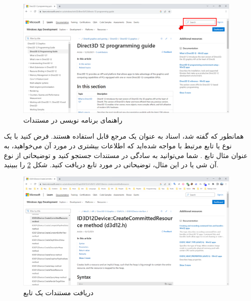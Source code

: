 {\begin{spacing}{1.5}
        \begin{figure}[H]
            \centering
            \setlength{\belowcaptionskip}{-10pt}
            \includegraphics[width=\textwidth]{Images/3/3.Intro.1.1}
            \caption{راهنمای برنامه نویسی  در مستندات }
            \label{fig:3.Intro.1.1}
        \end{figure}

        همانطور که گفته شد، اسناد به عنوان یک مرجع قابل استفاده هستند.
        فرض کنید با یک نوع یا تابع مرتبط با  مواجه شده‌اید که اطلاعات بیشتری در مورد آن می‌خواهید، به عنوان مثال تابع .
        شما می‌توانید به سادگی در مستندات جستجو کنید و توضیحاتی از نوع آن شی یا در این مثال، توضیحاتی در مورد تابع دریافت کنید. شکل \ref{fig:3.Intro.1.2} را ببینید.

        \begin{figure}[H]
            \centering
            \setlength{\belowcaptionskip}{-10pt}
            \includegraphics[width=\textwidth]{Images/3/3.Intro.1.2}
            \caption{دریافت مستندات یک تابع}
            \label{fig:3.Intro.1.2}
        \end{figure}


\end{spacing}}

